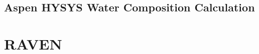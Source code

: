\documentclass[12pt]{UIdahoMastersThesis}
\begin{document}
\newpage

\section{Aspen HYSYS Water Composition Calculation}



\chapter{RAVEN}



% 

% 
\end{document}
